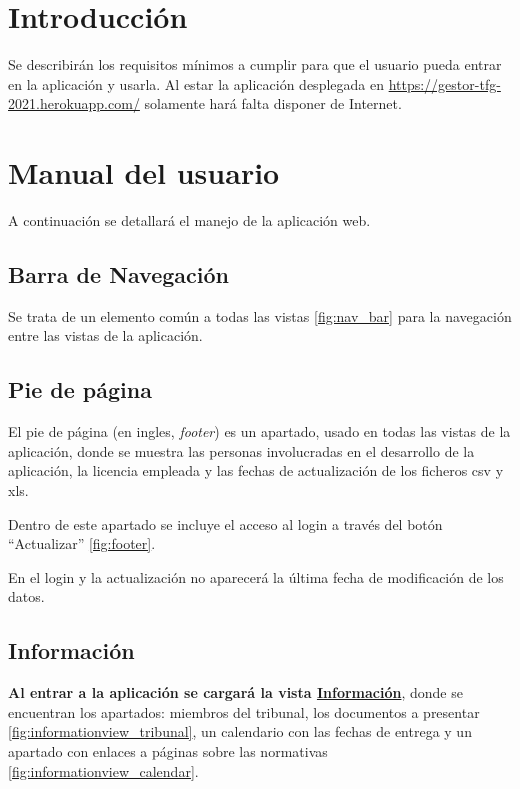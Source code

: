 
\section{Introducción}
Se describirán los requisitos mínimos a cumplir para que el usuario pueda entrar en la aplicación y usarla. Al estar la aplicación desplegada en \href{https://gestor-tfg-2021.herokuapp.com/}{https://gestor-tfg-2021.herokuapp.com/} solamente hará falta disponer de Internet.

\section{Manual del usuario}
A continuación se detallará el manejo de la aplicación web.

\subsection{Barra de Navegación}

Se trata de un elemento común a todas las vistas \ref{fig:nav_bar} para la navegación entre las vistas de la aplicación. 


\subsection{Pie de página}
El pie de página (en ingles, \emph{footer}) es un apartado, usado en todas las vistas de la aplicación, donde se muestra las personas involucradas en el desarrollo de la aplicación, la licencia empleada y las fechas de actualización de los ficheros csv y xls.

Dentro de este apartado se incluye el acceso al login a través del botón ``Actualizar'' \ref{fig:footer}. 


En el login y la actualización no aparecerá la última fecha de modificación de los datos.

\subsection{Información} 
\textbf{Al entrar a la aplicación se cargará la vista \href{https://gestor-tfg-2021.herokuapp.com/}{Información}}, donde se encuentran los apartados: miembros del tribunal, los documentos a presentar \ref{fig:informationview_tribunal}, un calendario con las fechas de entrega y un apartado con enlaces a páginas sobre las normativas \ref{fig:informationview_calendar}.


